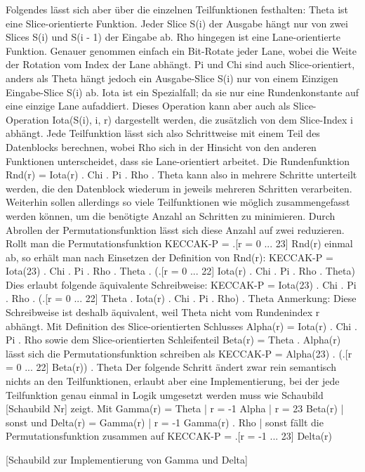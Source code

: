 Folgendes lässt sich aber über die einzelnen Teilfunktionen festhalten:
Theta ist eine Slice-orientierte Funktion.
Jeder Slice S(i) der Ausgabe hängt nur von zwei Slices S(i) und S(i - 1) der Eingabe ab.
Rho hingegen ist eine Lane-orientierte Funktion. Genauer genommen einfach ein Bit-Rotate jeder Lane, wobei die Weite der Rotation vom Index der Lane abhängt.
Pi und Chi sind auch Slice-orientiert, anders als Theta hängt jedoch ein Ausgabe-Slice S(i) nur von einem Einzigen Eingabe-Slice S(i) ab.
Iota ist ein Spezialfall; da sie nur eine Rundenkonstante auf eine einzige Lane aufaddiert.
Dieses Operation kann aber auch als Slice-Operation Iota(S(i), i, r) dargestellt werden, die zusätzlich von dem Slice-Index i abhängt.
Jede Teilfunktion lässt sich also Schrittweise mit einem Teil des Datenblocks berechnen, wobei Rho sich in der Hinsicht von den anderen Funktionen unterscheidet,
dass sie Lane-orientiert arbeitet. Die Rundenfunktion Rnd(r) = Iota(r) . Chi . Pi . Rho . Theta kann also in mehrere Schritte unterteilt werden,
die den Datenblock wiederum in jeweils mehreren Schritten verarbeiten. Weiterhin sollen allerdings so viele Teilfunktionen wie möglich
zusammengefasst werden können, um die benötigte Anzahl an Schritten zu minimieren. Durch Abrollen der Permutationsfunktion lässt sich diese Anzahl auf zwei reduzieren.
Rollt man die Permutationsfunktion
KECCAK-P = .[r = 0 ... 23] Rnd(r)
einmal ab, so erhält man nach Einsetzen der Definition von Rnd(r):
KECCAK-P = Iota(23) . Chi . Pi . Rho . Theta . (.[r = 0 ... 22] Iota(r) . Chi . Pi . Rho . Theta)
Dies erlaubt folgende äquivalente Schreibweise:
KECCAK-P = Iota(23) . Chi . Pi . Rho . (.[r = 0 ... 22] Theta . Iota(r) . Chi . Pi . Rho) . Theta
Anmerkung: Diese Schreibweise ist deshalb äquivalent, weil Theta nicht vom Rundenindex r abhängt.
Mit Definition des Slice-orientierten Schlusses Alpha(r) = Iota(r) . Chi . Pi . Rho sowie dem Slice-orientierten Schleifenteil
Beta(r) = Theta . Alpha(r)
lässt sich die Permutationsfunktion schreiben als
KECCAK-P = Alpha(23) . (.[r = 0 ... 22] Beta(r)) . Theta
Der folgende Schritt ändert zwar rein semantisch nichts an den Teilfunktionen, erlaubt aber eine Implementierung, bei der jede Teilfunktion
genau einmal in Logik umgesetzt werden muss wie Schaubild [Schaubild Nr] zeigt.
Mit Gamma(r) =  Theta   | r = -1
				Alpha	| r = 23
				Beta(r) | sonst
und Delta(r) =  Gamma(r)		| r = -1
				Gamma(r) . Rho  | sonst  
fällt die Permutationsfunktion zusammen auf
KECCAK-P = .[r = -1 ... 23] Delta(r)

[Schaubild zur Implementierung von Gamma und Delta]

